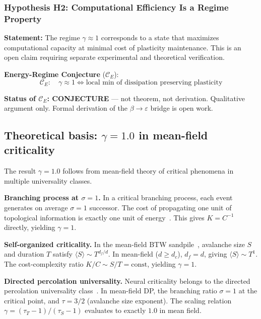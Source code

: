 \documentclass[11pt,a4paper,twocolumn]{article}
\begin{document}
\subsubsection{Hypothesis H2: Computational Efficiency Is a Regime Property}

\textbf{Statement:} The regime $\gamma \approx 1$ corresponds to a state that maximizes computational capacity at minimal cost of plasticity maintenance. This is an open claim requiring separate experimental and theoretical verification.

\textbf{Energy-Regime Conjecture} ($\mathcal{C}_E$):
\begin{equation}
\mathcal{C}_E:\quad \gamma \approx 1 \Longleftrightarrow \text{local min of dissipation preserving plasticity}
\end{equation}

\textbf{Status of $\mathcal{C}_E$: CONJECTURE} --- not theorem, not derivation. Qualitative argument only. Formal derivation of the $\beta \to \varepsilon$ bridge is open work.

\subsection{Theoretical basis: $\gamma = 1.0$ in mean-field criticality}

The result $\gamma = 1.0$ follows from mean-field theory of critical phenomena in multiple universality classes.

\textbf{Branching process at $\sigma = 1$.} In a critical branching process, each event generates on average $\sigma = 1$ successor. The cost of propagating one unit of topological information is exactly one unit of energy~\cite{harris1963}. This gives $K = C^{-1}$ directly, yielding $\gamma = 1$.

\textbf{Self-organized criticality.} In the mean-field BTW sandpile~\cite{bak1987}, avalanche size $S$ and duration $T$ satisfy $\langle S \rangle \sim T^{d_f/d}$. In mean-field ($d \geq d_c$), $d_f = d$, giving $\langle S \rangle \sim T^1$. The cost-complexity ratio $K/C \sim S/T = \text{const}$, yielding $\gamma = 1$.

\textbf{Directed percolation universality.} Neural criticality belongs to the directed percolation universality class~\cite{munoz1999,beggs2003}. In mean-field DP, the branching ratio $\sigma = 1$ at the critical point, and $\tau = 3/2$ (avalanche size exponent). The scaling relation $\gamma = (\tau_T - 1)/(\tau_S - 1)$ evaluates to exactly $1.0$ in mean field.
\end{document}
